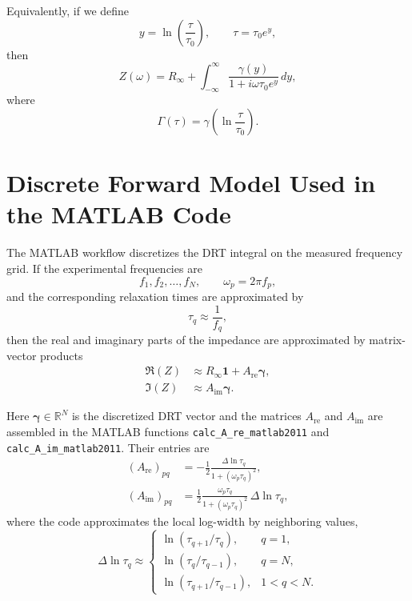 \documentclass[11pt]{article}
\begin{document}
Equivalently, if we define
\begin{equation}
y = \ln\left(\frac{\tau}{\tau_0}\right),
\qquad
\tau = \tau_0 e^y,
\end{equation}
then
\begin{equation}
Z(\omega) = R_{\infty} + \int_{-\infty}^{\infty} \frac{\gamma(y)}{1 + i\omega\tau_0 e^y} \, dy,
\end{equation}
where
\begin{equation}
\Gamma(\tau) = \gamma\left(\ln\frac{\tau}{\tau_0}\right).
\end{equation}

\section{Discrete Forward Model Used in the MATLAB Code}

The MATLAB workflow discretizes the DRT integral on the measured frequency grid. If the experimental frequencies are
\begin{equation}
f_1, f_2, \dots, f_N,
\qquad
\omega_p = 2\pi f_p,
\end{equation}
and the corresponding relaxation times are approximated by
\begin{equation}
\tau_q \approx \frac{1}{f_q},
\end{equation}
then the real and imaginary parts of the impedance are approximated by matrix-vector products
\begin{align}
\Re(Z) &\approx R_{\infty}\bm{1} + A_{\mathrm{re}}\bm{\gamma}, \\
\Im(Z) &\approx A_{\mathrm{im}}\bm{\gamma}.
\end{align}

Here $\bm{\gamma} \in \mathbb{R}^N$ is the discretized DRT vector and the matrices $A_{\mathrm{re}}$ and $A_{\mathrm{im}}$ are assembled in the MATLAB functions \texttt{calc\_A\_re\_matlab2011} and \texttt{calc\_A\_im\_matlab2011}. Their entries are
\begin{align}
\left(A_{\mathrm{re}}\right)_{pq} &= -\frac{1}{2}\frac{\Delta \ln \tau_q}{1 + (\omega_p \tau_q)^2}, \\
\left(A_{\mathrm{im}}\right)_{pq} &= \frac{1}{2}\frac{\omega_p \tau_q}{1 + (\omega_p \tau_q)^2}\,\Delta \ln \tau_q,
\end{align}
where the code approximates the local log-width by neighboring values,
\begin{equation}
\Delta \ln \tau_q \approx
\begin{cases}
\ln(\tau_{q+1}/\tau_q), & q=1, \\
\ln(\tau_q/\tau_{q-1}), & q=N, \\
\ln(\tau_{q+1}/\tau_{q-1}), & 1<q<N.
\end{cases}
\end{equation}
\end{document}
